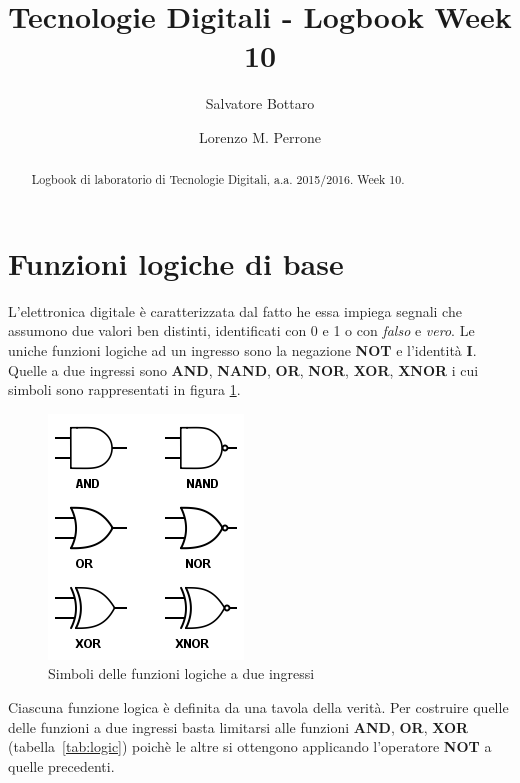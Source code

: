 \documentclass[journal, a4paper]{IEEEtran}
\begin{document}
	\title{Tecnologie Digitali - Logbook Week 10}
	\author[1]{Salvatore Bottaro}
		\author[2]{Lorenzo M. Perrone}
	\maketitle
	
\begin{abstract}
	Logbook di laboratorio di Tecnologie Digitali, a.a. 2015/2016. Week 10.
\end{abstract}

\section{Funzioni logiche di base}

L'elettronica digitale è caratterizzata dal fatto he essa impiega segnali che assumono due valori ben distinti, identificati con 0 e 1 o con \emph{falso} e \emph{vero}. Le uniche funzioni logiche ad un ingresso sono la negazione \textbf{NOT} e l'identità \textbf{I}. Quelle a due ingressi sono \textbf{AND}, \textbf{NAND}, \textbf{OR}, \textbf{NOR}, \textbf{XOR}, \textbf{XNOR} i cui simboli sono rappresentati in figura \ref{fig:logic}. 

\begin{figure}[htp]
\centering
\includegraphics[scale=.55]{logic}
\caption{Simboli delle funzioni logiche a due ingressi}
\label{fig:logic}
\end{figure}

Ciascuna funzione logica è definita da una tavola della verità. Per costruire quelle delle funzioni a due ingressi basta limitarsi alle funzioni \textbf{AND}, \textbf{OR}, \textbf{XOR} (tabella~\ref{tab:logic}) poichè le altre si ottengono applicando l'operatore \textbf{NOT} a quelle precedenti.
\end{document}
